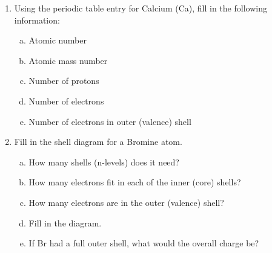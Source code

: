 \documentclass{article}[12pt]
\begin{document}
\begin{enumerate}
\item Using the periodic table entry for Calcium (Ca), fill in the
  following information:
\begin{enumerate}[a.]
  \item Atomic number 
  \item Atomic mass number
  \item Number of protons
  \item Number of electrons
  \item Number of electrons in outer (valence) shell
  \end{enumerate}

\item Fill in the shell diagram for a Bromine atom.
  \begin{enumerate}[a.]
    \item How many shells (n-levels) does it need?
    \item How many electrons fit in each of the inner (core) shells?
    \item How many electrons are in the outer (valence) shell?
    \item Fill in the diagram.
    \item If Br had a full outer shell, what would the overall charge be?
 \end{enumerate}

\end{enumerate}
\end{document}
